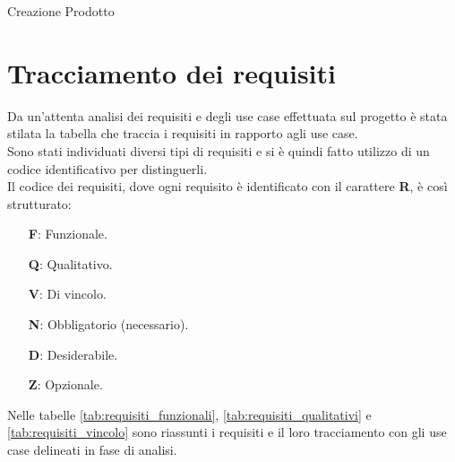 \begin{usecase}{2}{Creazione Prodotto}
    \label{uc:uc_creazione_prodotto}
\end{usecase}

\section{Tracciamento dei requisiti}
Da un'attenta analisi dei requisiti e degli use case effettuata sul progetto è stata stilata la tabella che traccia i requisiti in rapporto agli use case.\\
Sono stati individuati diversi tipi di requisiti e si è quindi fatto utilizzo di un codice identificativo per distinguerli.\\
Il codice dei requisiti, dove ogni requisito è identificato con il carattere \textbf{R}, è così strutturato:
\begin{enumerate}
    \item[\textbf{F}:] Funzionale.
    \item[\textbf{Q}:] Qualitativo.
    \item[\textbf{V}:] Di vincolo.
    \item[\textbf{N}:] Obbligatorio (necessario).
    \item[\textbf{D}:] Desiderabile.
    \item[\textbf{Z}:] Opzionale.
\end{enumerate}

Nelle tabelle \ref{tab:requisiti_funzionali}, \ref{tab:requisiti_qualitativi} e \ref{tab:requisiti_vincolo} sono riassunti i requisiti e il loro tracciamento con gli use case delineati in fase di analisi.

